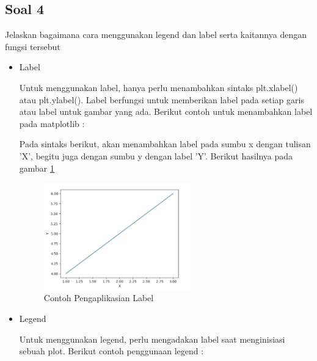 \subsection{Soal 4}
Jelaskan bagaimana cara menggunakan legend dan label serta kaitannya dengan fungsi tersebut
\begin{itemize}
\item Label

Untuk menggunakan label, hanya perlu menambahkan sintaks plt.xlabel() atau plt.ylabel(). Label berfungsi untuk memberikan label pada setiap garis atau label untuk gambar yang ada. Berikut contoh untuk menambahkan label pada matplotlib : 

Pada sintaks berikut, akan menambahkan label pada sumbu x dengan tulisan 'X', begitu juga dengan sumbu y dengan label 'Y'. Berikut hasilnya pada gambar \ref{Contoh_Soal4Label} 
\begin{figure} [ht]
	\centerline{\includegraphics[width=0.6\textwidth]{figures/6/1174035/Teori/Soal4Label.png}}
	\caption{Contoh Pengaplikasian Label}
	\label{Contoh_Soal4Label}
\end{figure}

\item Legend

Untuk menggunakan legend, perlu mengadakan label saat menginisiasi sebuah plot. Berikut contoh penggunaan legend : 



\end{itemize}

